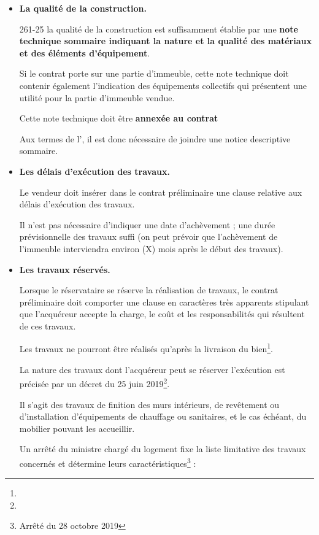 \begin{enumerate}
\begin{itemize}
							\item \textbf{La qualité de la construction.}

								\begin{citationArticle}[R]{261-25}{\cch}
								\lips	la qualité de la construction est suffisamment établie par une \textbf{note technique sommaire indiquant la nature et la qualité des matériaux et des éléments d'équipement}.

								Si le contrat porte sur une partie d'immeuble, cette note technique doit contenir également l'indication des équipements collectifs qui présentent une utilité pour la partie d'immeuble vendue.

								Cette note technique doit être \textbf{annexée au contrat}
								\end{citationArticle}

								Aux termes de l', il est donc nécessaire de joindre une notice descriptive sommaire.

							\item \textbf{Les délais d'exécution des travaux.}

								Le vendeur doit insérer dans le contrat préliminaire une clause relative aux délais d’exécution des travaux.

								Il n'est pas nécessaire d'indiquer une date d'achèvement ; une durée prévisionnelle des travaux suffi (on peut prévoir que l’achèvement de l’immeuble interviendra environ (X) mois après le début des travaux).

							\item \textbf{Les travaux réservés.}

								Lorsque le réservataire se réserve la réalisation de travaux, le contrat préliminaire doit comporter une clause en caractères très apparents stipulant que l'acquéreur accepte la charge, le coût et les responsabilités qui résultent de ces travaux.

								Les travaux ne pourront être réalisés qu’après la livraison du bien\footnote{}.

								La nature des travaux dont l'acquéreur peut se réserver l'exécution est précisée par un décret du 25 juin 2019\footnote{}.

								Il s’agit des travaux de finition des murs intérieurs, de revêtement ou d'installation d'équipements de chauffage ou sanitaires, et le cas échéant, du mobilier pouvant les accueillir.

								Un arrêté du ministre chargé du logement fixe la liste limitative des travaux concernés et détermine leurs caractéristiques\footnote{Arrêté du 28 octobre 2019} :
								\begin{quote}


\end{quote}
\end{itemize}
\end{enumerate}
